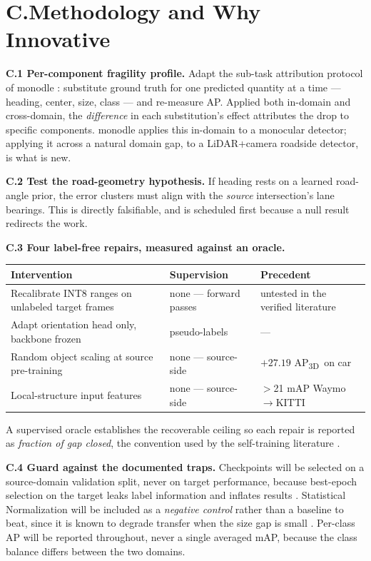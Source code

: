 \documentclass[10pt,letterpaper]{article}
\newcommand{\apthree}{AP\textsubscript{3D}}
\newcommand{\too}{\ensuremath{\rightarrow}}
\begin{document}
\section{C.\quad Methodology and Why Innovative}

\textbf{C.1 Per-component fragility profile.} Adapt the sub-task attribution protocol of
monodle \cite{monodle}: substitute ground truth for one predicted quantity at a time ---
heading, center, size, class --- and re-measure AP. Applied both in-domain and cross-domain,
the \emph{difference} in each substitution's effect attributes the drop to specific components.
monodle applies this in-domain to a monocular detector; applying it across a natural domain
gap, to a LiDAR+camera roadside detector, is what is new.

\textbf{C.2 Test the road-geometry hypothesis.} If heading rests on a learned road-angle prior,
the error clusters must align with the \emph{source} intersection's lane bearings. This is
directly falsifiable, and is scheduled first because a null result redirects the work.

\textbf{C.3 Four label-free repairs, measured against an oracle.}

\begin{center}\small
\begin{tabular}{@{}p{}p{}p{}@{}}
\toprule
\textbf{Intervention} & \textbf{Supervision} & \textbf{Precedent} \\
\midrule
Recalibrate INT8 ranges on unlabeled target frames & none --- forward passes &
  untested in the verified literature \\
Adapt orientation head only, backbone frozen & pseudo-labels & --- \\
Random object scaling at source pre-training & none --- source-side &
  $+27.19$ \apthree\ on car \cite{st3dpp} \\
Local-structure input features & none --- source-side &
  $>$21 mAP Waymo\too KITTI \cite{gblobs} \\
\bottomrule
\end{tabular}
\end{center}

A supervised oracle establishes the recoverable ceiling so each repair is reported as
\emph{fraction of gap closed}, the convention used by the self-training literature \cite{st3d}.

\textbf{C.4 Guard against the documented traps.} Checkpoints will be selected on a
source-domain validation split, never on target performance, because best-epoch selection on
the target leaks label information and inflates results \cite{st3drepro}. Statistical
Normalization will be included as a \emph{negative control} rather than a baseline to beat,
since it is known to degrade transfer when the size gap is small \cite{st3d}. Per-class AP will
be reported throughout, never a single averaged mAP, because the class balance differs between
the two domains.
\end{document}
